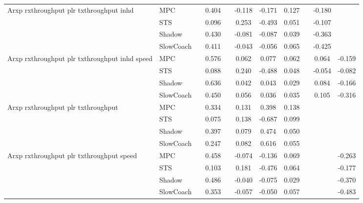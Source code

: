 \begin{tabular}{|l|l|*{9}{c|}}
\midrule
Arxp rxthroughput plr txthroughput inhd    & MPC &       &     0.404 &        & -0.118 & -0.171 &  0.127 &      &  -0.180 &       \\
                              & STS &       &     0.096 &        &  0.253 & -0.493 &  0.051 &      &  -0.107 &       \\
                              & Shadow &       &     0.430 &        & -0.081 & -0.087 &  0.039 &      &  -0.363 &       \\
                              & SlowCoach &       &     0.411 &        & -0.043 & -0.056 &  0.065 &      &  -0.425 &       \\
\midrule
Arxp rxthroughput plr txthroughput inhd speed    & MPC &       &     0.576 &        &  0.062 &  0.077 &  0.062 &      &   0.064 &   -0.159 \\
                              & STS &       &     0.088 &        &  0.240 & -0.488 &  0.048 &      &  -0.054 &   -0.082 \\
                              & Shadow &       &     0.636 &        &  0.042 &  0.043 &  0.029 &      &   0.084 &   -0.166 \\
                              & SlowCoach &       &     0.450 &        &  0.056 &  0.036 &  0.035 &      &   0.105 &   -0.316 \\
\midrule
Arxp rxthroughput plr txthroughput    & MPC &       &     0.334 &        &  0.131 &  0.398 &  0.138 &      &      &       \\
                              & STS &       &     0.075 &        &  0.138 & -0.687 &  0.099 &      &      &       \\
                              & Shadow &       &     0.397 &        &  0.079 &  0.474 &  0.050 &      &      &       \\
                              & SlowCoach &       &     0.247 &        &  0.082 &  0.616 &  0.055 &      &      &       \\
\midrule
Arxp rxthroughput plr txthroughput speed    & MPC &       &     0.458 &        & -0.074 & -0.136 &  0.069 &      &      &   -0.263 \\
                              & STS &       &     0.103 &        &  0.181 & -0.476 &  0.064 &      &      &   -0.177 \\
                              & Shadow &       &     0.486 &        & -0.040 & -0.075 &  0.029 &      &      &   -0.370 \\
                              & SlowCoach &       &     0.353 &        & -0.057 & -0.050 &  0.057 &      &      &   -0.483 \\

\end{tabular}
